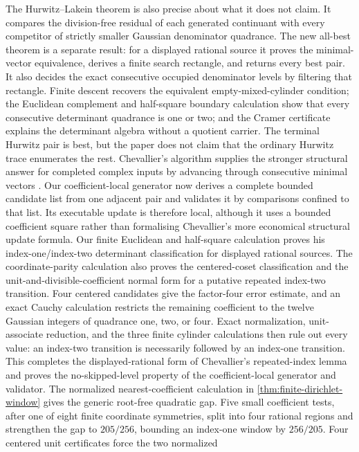 \documentclass[11pt]{article}
\begin{document}
The Hurwitz--Lakein theorem is also precise about what it does not claim.  It
compares the division-free residual of each generated continuant with every
competitor of strictly smaller Gaussian denominator quadrance.  The new
all-best theorem is a separate result: for a displayed rational source it
proves the minimal-vector equivalence, derives a finite search rectangle, and
returns every best pair.  It also decides the exact consecutive occupied
denominator levels by filtering that rectangle.  Finite descent recovers the
equivalent empty-mixed-cylinder condition; the Euclidean complement and
half-square boundary calculation show that every consecutive determinant
quadrance is one or two; and the Cramer certificate explains the determinant
algebra without a quotient carrier.
The terminal Hurwitz pair is best, but the paper does not claim that the
ordinary Hurwitz trace enumerates the rest.
Chevallier's algorithm supplies the stronger structural answer for completed
complex inputs by advancing through consecutive minimal vectors
\cite{ChevallierGaussLattices}.  Our coefficient-local generator now derives
a complete bounded candidate list from one adjacent pair and validates it by
comparisons confined to that list.  Its executable update is therefore local,
although it uses a bounded coefficient square rather than formalising
Chevallier's more economical structural update formula.  Our finite
Euclidean and half-square calculation proves his index-one/index-two determinant
classification for displayed rational sources.  The coordinate-parity
calculation also proves the centered-coset classification and the
unit-and-divisible-coefficient normal form for a putative repeated index-two
transition.  Four centered candidates give the factor-four error estimate,
and an exact Cauchy calculation restricts the remaining coefficient to the
twelve Gaussian integers of quadrance one, two, or four.  Exact normalization,
unit-associate reduction, and the three finite cylinder calculations then
rule out every value: an index-two transition is necessarily followed by an
index-one transition.  This completes the displayed-rational form of
Chevallier's repeated-index lemma and proves the no-skipped-level property of
the coefficient-local generator and validator.  The normalized
nearest-coefficient calculation in \cref{thm:finite-dirichlet-window} gives
the generic root-free quadratic gap.  Five small coefficient tests, after
one of eight finite coordinate symmetries, split into four rational regions
and strengthen the gap to $205/256$, bounding an index-one window by
$256/205$.  Four centered unit certificates force the two normalized
\end{document}
